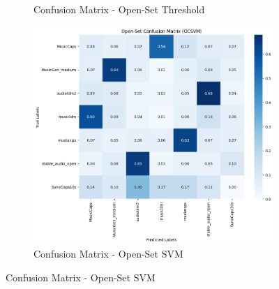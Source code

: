\documentclass[conference]{IEEEtran}  %
\begin{document}
\begin{figure}
\begin{subfigure}[b]{0.32\textwidth}
        \caption{Confusion Matrix - Open-Set Threshold}
        \label{fig: Open-Set Threshold}
    \end{subfigure}%
    \hfill
    \begin{subfigure}[b]{0.32\textwidth}
        \centering
        \includegraphics[width=\linewidth]{Figures/ConfusionMatrixOpenSetSVM.PNG}
        \caption{Confusion Matrix - Open-Set SVM}
        \label{fig: Open-Set SVM}
    \end{subfigure}

  
\label{fig:all_conf_matrices} %

\end{figure}
    
\end{document}
